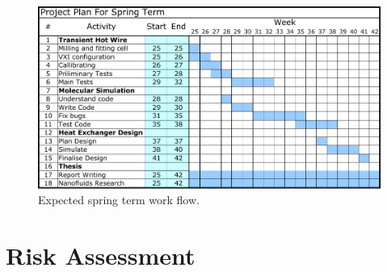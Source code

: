 \documentclass[12pt,MEng]{UoAThesis}
\makeatletter
\newcommand{\unchapter}[1]{%
  \begingroup
  \let\@makechapterhead\@gobble %
  \chapter{#1}
  \endgroup
}
\makeatother
\begin{document}
\begin{figure}[htpb]
  \centering
  \includegraphics[clip,width=1\linewidth]{figures/Gchart.pdf}
  \caption{\label{fig:gchart} Expected spring term work flow.}
\end{figure}


\unchapter{Risk Assessment}


\printbibliography[heading=thesisChapterBib]


\end{document}
